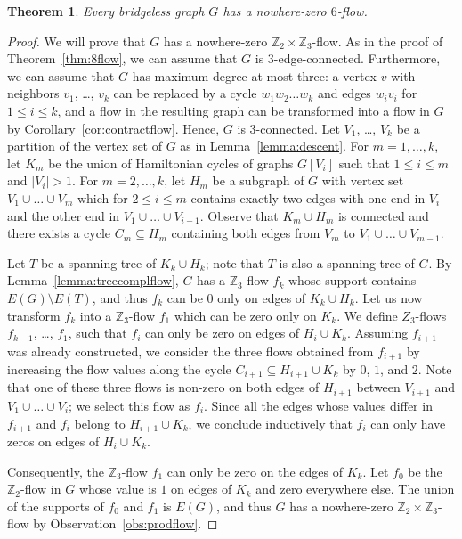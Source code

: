 \documentclass[12pt,twoside,openright,a4paper]{book}
\newtheorem{theorem}{Theorem}[chapter]
\begin{document}
\begin{theorem}\label{thm:6flow}
Every bridgeless graph $G$ has a nowhere-zero $6$-flow.
\end{theorem}
\begin{proof}
We will prove that $G$ has a nowhere-zero $\mathbb{Z}_2\times\mathbb{Z}_3$-flow.
As in the proof of Theorem~\ref{thm:8flow}, we can assume that $G$ is $3$-edge-connected.  Furthermore, we can assume that $G$ has maximum degree at most
three: a vertex $v$ with neighbors $v_1$, \ldots, $v_k$ can be replaced by a cycle $w_1w_2\ldots w_k$ and edges $w_iv_i$ for $1\le i\le k$,
and a flow in the resulting graph can be transformed into a flow in $G$ by Corollary~\ref{cor:contractflow}.  Hence,
$G$ is $3$-connected.  Let $V_1$, \ldots, $V_k$ be a partition of the vertex set of $G$ as in Lemma~\ref{lemma:descent}.
For $m=1, \ldots, k$, let $K_m$ be the union of Hamiltonian cycles of graphs $G[V_i]$ such that $1\le i\le m$ and $|V_i|>1$.
For $m=2, \ldots, k$, let $H_m$ be a subgraph of $G$ with vertex set $V_1\cup \ldots\cup V_m$ which for $2\le i\le m$ contains exactly two edges
with one end in $V_i$ and the other end in $V_1\cup \ldots\cup V_{i-1}$.  Observe that $K_m\cup H_m$ is connected and there exists a cycle $C_m\subseteq H_m$
containing both edges from $V_m$ to $V_1\cup\ldots\cup V_{m-1}$.

Let $T$ be a spanning tree of $K_k\cup H_k$; note that $T$ is also a spanning tree of $G$.  By Lemma~\ref{lemma:treecomplflow}, $G$ has a $\mathbb{Z}_3$-flow $f_k$
whose support contains $E(G)\setminus E(T)$, and thus $f_k$ can be $0$ only on edges of $K_k\cup H_k$.  Let us now transform $f_k$ into a $\mathbb{Z}_3$-flow $f_1$
which can be zero only on $K_k$.  We define $Z_3$-flows $f_{k-1}$, \ldots, $f_1$, such that $f_i$ can only be zero
on edges of $H_i\cup K_k$.  Assuming $f_{i+1}$ was already constructed, we consider the three flows obtained from $f_{i+1}$ by increasing the flow values
along the cycle $C_{i+1}\subseteq H_{i+1}\cup K_k$ by $0$, $1$, and $2$.  Note that one of these three flows is non-zero on both edges of $H_{i+1}$ between $V_{i+1}$ and $V_1\cup\ldots\cup V_i$;
we select this flow as $f_i$.  Since all the edges whose values differ in $f_{i+1}$ and $f_i$ belong to $H_{i+1}\cup K_k$, we conclude inductively that $f_i$ can only have zeros
on edges of $H_i\cup K_k$.

Consequently, the $\mathbb{Z}_3$-flow $f_1$ can only be zero on the edges of $K_k$.
Let $f_0$ be the $\mathbb{Z}_2$-flow in $G$ whose value is $1$ on edges of $K_k$ and zero everywhere else.
The union of the supports of $f_0$ and $f_1$ is $E(G)$, and thus $G$ has a nowhere-zero $\mathbb{Z}_2\times \mathbb{Z}_3$-flow by Observation~\ref{obs:prodflow}.
\end{proof}
\end{document}
